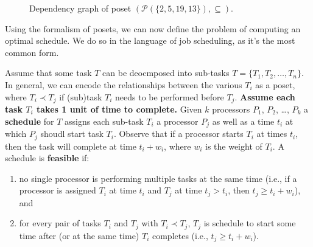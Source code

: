 \documentclass{article}
\begin{document}
\begin{figure}[htbp]
{
        }
        \caption{Dependency graph of poset $(\mathcal{P}(\{2, 5, 19, 13\}), \subseteq)$.}
        \label{fig:Q2}
    \end{figure}
    
    Using the formalism of posets, we can now define the problem of computing an optimal schedule. We do so in the language of job scheduling, as it's the most common form. 

    \vspace{3mm} Assume that some task $T$ can be deocmposed into sub-tasks $T = \{T_{1}, T_{2}, \dots, T_{n}\}$. In general, we can encode the relationships between the various $T_{i}$ as a poset, where $T_{i} \prec T_{j}$ if (sub)task $T_{i}$ needs to be performed before $T_{j}$. \textbf{Assume each task $T_{i}$ takes 1 unit of time to complete.} Given $k$ processors $P_{1}$, $P_{2}$, \dots, $P_{k}$ a \textbf{schedule} for $T$ assigns each sub-task $T_{i}$ a processor $P_{j}$ as well as a time $t_{i}$ at which $P_{j}$ shoudl start task $T_{i}$. Observe that if a processor starts $T_{i}$ at times $t_{i}$, then the task will complete at time $t_{i} + w_{i}$, where $w_{i}$ is the weight of $T_{i}$. A schedule is \textbf{feasible} if:

    \begin{enumerate}[label = \arabic*]
        \item no single processor is performing multiple tasks at the same time (i.e., if a processor is assigned $T_{i}$ at time $t_{i}$ and $T_{j}$ at time $t_{j} > t_{i}$, then $t_{j} \ge t_{i} + w_{i}$), and
        \item for every pair of tasks $T_{i}$ and $T_{j}$ with $T_{i} \prec T_{j}$, $T_{j}$ is schedule to start some time after (or at the same time) $T_{i}$ completes (i.e., $t_{j} \ge t_{i} + w_{i}$).
    \end{enumerate}
\end{document}
